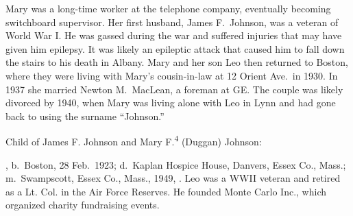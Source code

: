Mary was a long-time worker at the telephone company, eventually becoming switchboard supervisor.\cite{Mary4DugganPhone} Her first husband, James F.\ Johnson, was a veteran of World War I. He was gassed during the war and suffered injuries that may have given him epilepsy. It was likely an epileptic attack that caused him to fall down the stairs to his death in Albany. Mary and her son Leo then returned to Boston, where they were living with Mary's cousin-in-law at 12 Orient Ave.\ in 1930.\cite{Census1930Mary4Duggan} In 1937 she married Newton M.\ MacLean, a foreman at GE.\cite{Mary4Duggan1939} The couple was likely divorced by 1940, when Mary was living alone with Leo in Lynn and had gone back to using the surname ``Johnson.''\cite{Census1940Mary4Duggan}

\begin{KidsIntro}
	Child of James F. Johnson and Mary F.\textsuperscript{4} (Duggan) Johnson:
\end{KidsIntro}

\begin{Kids}
	
	, b.\ Boston, 28 Feb.\ 1923;\cite{Leo5JohnsonBirth} d.\ Kaplan Hospice House, Danvers, Essex Co., Mass.;\cite{Leo5JohnsonObit:1} m.\ Swampscott, Essex Co., Mass., 1949, .\cite{MargaretLangfordMarriage} Leo was a WWII veteran and retired as a Lt. Col. in the Air Force Reserves. He founded Monte Carlo Inc., which organized charity fundraising events.\cite{Leo5JohnsonObit:2}
	
\end{Kids}
